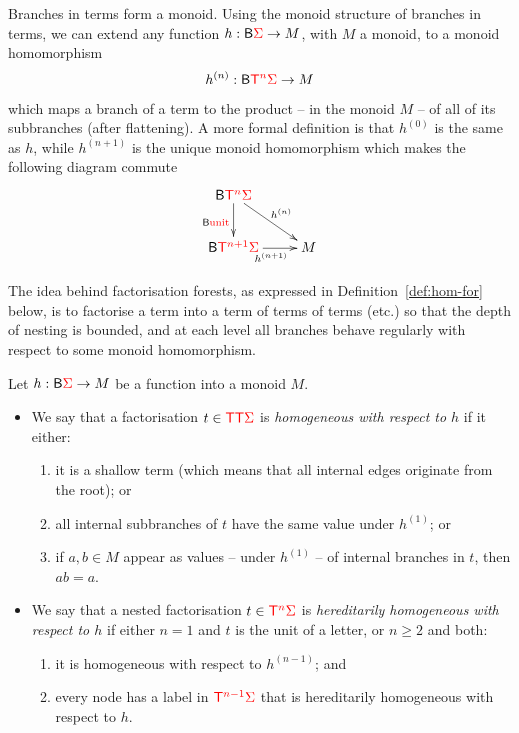 \newcommand{\hb}[2]{#2^{(#1)}}
Branches in  terms  form a monoid. Using the monoid structure of branches in terms, we can extend any function  $h : \mathsf{B} {\color{red}{\Sigma}} \to M$, with $M$ a monoid, to a  monoid homomorphism
\begin{align*}
\hb n h : \branches \tmonadn n \rSigma \to M
\end{align*}
which maps a branch of a term to the product -- in the monoid $M$ -- of all of its subbranches (after flattening).  A more formal definition is that $\hb 0 h$ is the same as $h$, while  $\hb {n+1} h$  is the unique monoid homomorphism  which makes the following diagram commute
\begin{align*}
\xymatrix{
    \branches \tmonadn n \rSigma \ar[dr]^{\hb n h} \ar[d]_{\branches \unit}\\
    \ar[r]_{\hb {n+1}  h}\branches \tmonadn {n+1} \rSigma & M
}
\end{align*}


The idea behind factorisation forests, as expressed in Definition~\ref{def:hom-for} below, is to factorise a term into a term of terms of terms (etc.) so that the depth of nesting is bounded, and at each level all branches behave regularly with respect to some monoid homomorphism. 

\begin{definition}\label{def:hom-for}
    Let $h : \mathsf{B} {\color{red}{\Sigma}} \to M$ be a function into a monoid $M$. 
    \begin{itemize}
\item     We say that a factorisation $t \in {\color{red}{\mathsf T}} {\color{red}{\mathsf T}} {\color{red}{\Sigma}}$ is \emph{homogeneous with respect to $h$} if it either:
\begin{enumerate}
    \item \label{it:factfor-shallow} it is a shallow term (which means that all internal edges originate from the root); or 
    \item \label{it:factfor-allsame} all internal subbranches of $t$ have the same value under $\hb 1 h$; or
    \item \label{it:factfor-ab} if $a,b \in M$ appear as values -- under $\hb 1 h$ -- of internal branches in $t$, then $ab=a$. 
\end{enumerate}
\item We say that a nested factorisation  $t \in {\color{red}{\mathsf T}}^{{\color{red}{n}}} {\color{red}{\Sigma}}$ is \emph{hereditarily homogeneous with respect to $h$} if either $n=1$ and $t$ is the unit of a letter, or $n \ge 2$ and both:
\begin{enumerate}
    \item  it is homogeneous with respect to $\hb {n-1} h$; and 
    \item every node has a label in ${\color{red}{\mathsf T}}^{{\color{red}{n-1}}} {\color{red}{\Sigma}}$ that is hereditarily homogeneous with respect to $h$.
\end{enumerate}
    \end{itemize}
\end{definition}


